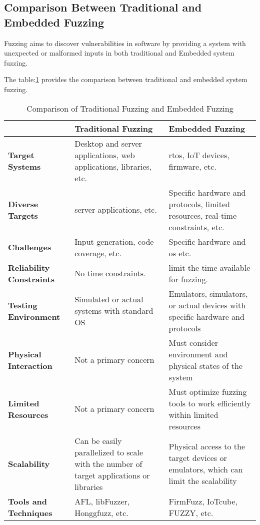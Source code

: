 \subsection{Comparison Between Traditional and Embedded Fuzzing}
Fuzzing aims to discover vulnerabilities in software by providing a system with
unexpected or malformed inputs in both traditional and Embedded system fuzzing.

The table:\ref{tab:fuzzing_comparison} provides the comparison between traditional
and embedded system fuzzing\cite{yun2022fuzzing}\cite{9742291}.

\begin{table}[h!]
\centering
\begin{tabularx}{\textwidth}{@{}>{\raggedright\arraybackslash}p{3cm}X X@{}}
\toprule
        & \textbf{Traditional Fuzzing} & \textbf{Embedded Fuzzing} \\
\midrule
\textbf{Target Systems} & Desktop and server applications, web applications, libraries, etc. & \acrlong{rtos}, IoT devices, firmware, etc. \\
\addlinespace
\textbf{Diverse Targets} & server applications, etc. & Specific hardware and protocols, limited resources, real-time constraints, etc. \\
\addlinespace
\textbf{Challenges} & Input generation, code coverage, etc. & Specific hardware and \acrlong{os} etc. \\
\addlinespace
\textbf{Reliability Constraints} & No time constraints. & limit the time available for fuzzing. \\
\addlinespace
\textbf{Testing Environment} & Simulated or actual systems with standard OS & Emulators,
simulators, or actual devices with specific hardware and protocols \\
\addlinespace
\textbf{Physical Interaction} & Not a primary concern & Must consider environment and physical states of the system \\
\addlinespace
\textbf{Limited Resources} & Not a primary concern & Must optimize fuzzing tools to work efficiently within limited resources \\
\addlinespace
\textbf{Scalability} & Can be easily parallelized to scale with the number of
target applications or libraries & Physical access to the target
devices or emulators, which can limit the scalability  \\
\addlinespace
\textbf{Tools and Techniques} & AFL, libFuzzer, Honggfuzz, etc. & FirmFuzz, IoTcube, FUZZY, etc. \\
\bottomrule
\end{tabularx}
\caption{Comparison of Traditional Fuzzing and Embedded Fuzzing}
\label{tab:fuzzing_comparison}
\end{table}

